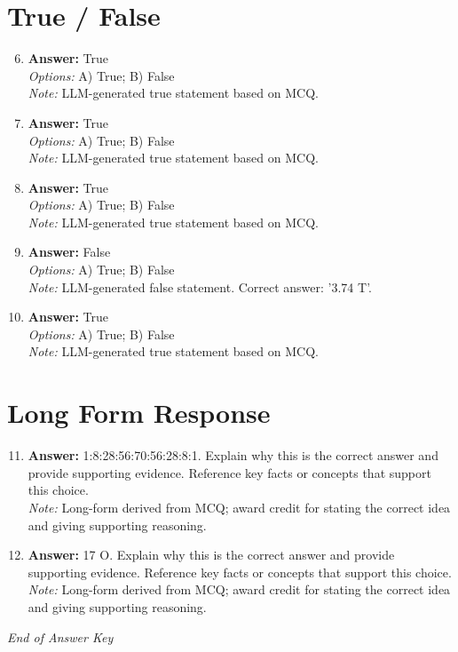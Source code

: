 \documentclass[12pt]{article}
\begin{document}
\section*{True / False}
\begin{enumerate}[label=\arabic*.]
\setcounter{enumi}{5}
\item \textbf{Answer:} True
\\ \textit{Options:} A) True; B) False
\\ \textit{Note:} LLM-generated true statement based on MCQ.
\item \textbf{Answer:} True
\\ \textit{Options:} A) True; B) False
\\ \textit{Note:} LLM-generated true statement based on MCQ.
\item \textbf{Answer:} True
\\ \textit{Options:} A) True; B) False
\\ \textit{Note:} LLM-generated true statement based on MCQ.
\item \textbf{Answer:} False
\\ \textit{Options:} A) True; B) False
\\ \textit{Note:} LLM-generated false statement. Correct answer: '3.74 T'.
\item \textbf{Answer:} True
\\ \textit{Options:} A) True; B) False
\\ \textit{Note:} LLM-generated true statement based on MCQ.
\end{enumerate}

\section*{Long Form Response}
\begin{enumerate}[label=\arabic*.]
\setcounter{enumi}{10}
\item \textbf{Answer:} 1:8:28:56:70:56:28:8:1. Explain why this is the correct answer and provide supporting evidence. Reference key facts or concepts that support this choice.
\\ \textit{Note:} Long-form derived from MCQ; award credit for stating the correct idea and giving supporting reasoning.
\item \textbf{Answer:} 17 O. Explain why this is the correct answer and provide supporting evidence. Reference key facts or concepts that support this choice.
\\ \textit{Note:} Long-form derived from MCQ; award credit for stating the correct idea and giving supporting reasoning.
\end{enumerate}

\vfill
\noindent\textit{End of Answer Key}
\end{document}
